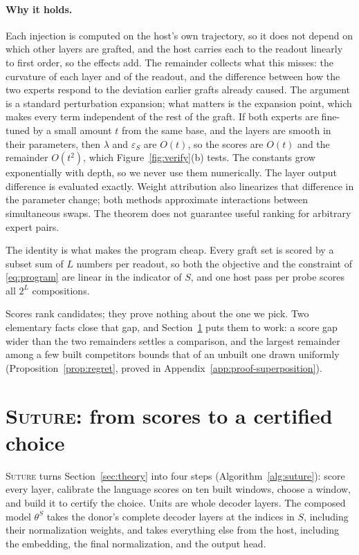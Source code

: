 \documentclass{article}
\theoremstyle{plain}
\theoremstyle{definition}
\theoremstyle{remark}
\begin{document}
\paragraph{Why it holds.}
Each injection is computed on the host's own trajectory, so it does not depend on
which other layers are grafted, and the host carries each to the readout linearly
to first order, so the effects add. The remainder collects what this misses: the
curvature of each layer and of the readout, and the difference between how the
two experts respond to the deviation earlier grafts already caused. The argument is a
standard perturbation expansion; what matters is the expansion point, which makes
every term independent of the rest of the graft. If both experts are fine-tuned
by a small amount $t$ from the same base, and the layers are smooth in their
parameters, then $\lambda$ and $\varepsilon_S$ are $O(t)$, so the scores are
$O(t)$ and the remainder $O(t^2)$, which Figure~\ref{fig:verify}(b) tests. The
constants grow exponentially with depth, so we never use them numerically.
The layer output difference is evaluated exactly. Weight attribution also
linearizes that difference in the parameter change; both methods approximate
interactions between simultaneous swaps. The theorem does not guarantee useful
ranking for arbitrary expert pairs.

The identity is what makes the program cheap. Every graft set is scored by a
subset sum of $L$ numbers per readout, so both the objective and the constraint
of \eqref{eq:program} are linear in the indicator of $S$, and one host pass per
probe scores all $2^L$ compositions.

Scores rank candidates; they prove nothing about the one we pick. Two
elementary facts close that gap, and Section~\ref{sec:method} puts them to work:
a score gap wider than the two remainders settles a comparison, and the largest
remainder among a few built competitors bounds that of an unbuilt one drawn
uniformly (Proposition~\ref{prop:regret}, proved in
Appendix~\ref{app:proof-superposition}).

\section{\textsc{Suture}: from scores to a certified choice}
\label{sec:method}

\textsc{Suture} turns Section~\ref{sec:theory} into four steps
(Algorithm~\ref{alg:suture}): score every layer, calibrate the language scores on
ten built windows, choose a window, and build it to certify the choice. Units are
whole decoder layers. The composed model
$\theta^{S}$ takes the donor's complete decoder layers at the indices in $S$,
including their normalization weights, and takes everything else from the host,
including the embedding, the final normalization, and the output head.
\end{document}
